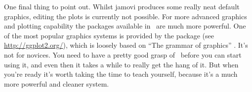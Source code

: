 One final thing to point out. Whilst jamovi produces some really neat default graphics, editing the plots is currently not possible. For more advanced graphics and plotting capability the packages available in \R\ are much more powerful. One of the most popular graphics systems is provided by the  package (see \url{http://ggplot2.org/}), which is loosely based on ``The grammar of graphics'' \parencite{Wilkinson2006}. It's not for novices. You need to have a pretty good grasp of \R\ before you can start using it, and even then it takes a while to really get the hang of it. But when you're ready it's worth taking the time to teach yourself, because it's a much more powerful and cleaner system.





